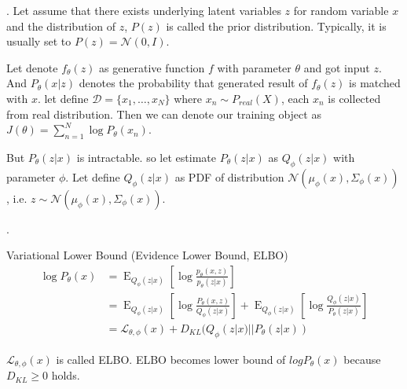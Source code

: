\documentclass[8pt]{beamer}
\newcommand{\mc}[1]{\mathcal{#1}}
\newcommand{\expe}{\operatorname{E}}
\begin{document}
\begin{frame}{.}
    Let assume that there exists underlying latent variables $z$ for random variable $x$ and the distribution of $z$, $P(z)$ is called the prior distribution. Typically, it is usually set to $P(z) = \mc{N}(0, I)$.
    \bigskip

    Let denote $f_\theta(z)$ as generative function $f$ with parameter $\theta$ and got input $z$.
    And $P_\theta(x|z)$ denotes the probability that generated result of $f_\theta(z)$ is matched with $x$.
    let define $\mc{D} = \{x_1, \dots, x_N\}$ where $x_n \sim P_{real}(X)$, each $x_n$ is collected from real distribution.
    Then we can denote our training object as $J(\theta) = \sum_{n=1}^N \log{P_\theta(x_n)}$.

    But $P_\theta (z|x)$ is intractable. so let estimate $P_\theta (z|x)$ as $Q_\phi (z|x)$ with parameter $\phi$. Let define $Q_\phi(z|x)$ as PDF of distribution $\mc{N}(\mu_\phi(x),\Sigma_\phi(x))$, i.e. $z \sim \mc{N}(\mu_\phi(x), \Sigma_\phi(x))$.

\end{frame}

\begin{frame}{.}
    \begin{block}{Variational Lower Bound (Evidence Lower Bound, ELBO)}
        \[
            \begin{aligned}
                \log P_\theta (x) &= \expe_{Q_\phi(z|x)} \left[ \log \frac{p_\theta (x,z)}{p_\theta (z|x)} \right] \\
                &= \expe_{Q_\phi (z|x)} \left[\log \frac{P_\theta(x,z)}{Q_\phi (z|x)}\right] + \expe_{Q_\phi (z|x)} \left[ \log \frac{Q_\phi(z|x)}{P_\theta(z|x)} \right]\\ 
                &= \mc{L}_{\theta, \phi}(x) + D_{KL}(Q_\phi(z|x) || P_\theta (z|x))
            \end{aligned}
        \]
    \end{block}

    $\mc{L}_{\theta, \phi}(x)$ is called ELBO. ELBO becomes lower bound of $log P_\theta (x)$ because $D_{KL} \geq 0$ holds.
\end{frame}
\end{document}
